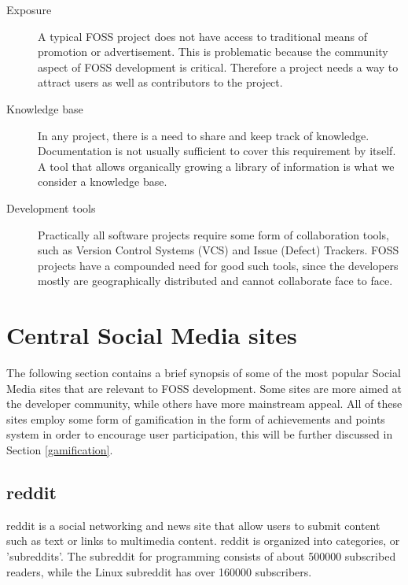 \documentclass[a4paper,11pt]{article} %
\begin{document}
\begin{description}
\item[Exposure] \hfill
  
  A typical FOSS project does not have access to traditional means of
  promotion or advertisement. This is problematic because the community
  aspect of FOSS development is critical. Therefore a project needs a way to
  attract users as well as contributors to the project.
\item[Knowledge base] \hfill

  In any project, there is a need to share and keep track of
  knowledge. Documentation is not usually sufficient to cover this
  requirement by itself. A tool that allows organically growing a
  library of information is what we consider a knowledge base.
\item[Development tools] \hfill
  
  Practically all software projects require some form of collaboration
  tools, such as Version Control Systems (VCS) and Issue (Defect)
  Trackers. FOSS projects have a compounded need for good such tools, since
  the developers mostly are geographically distributed and cannot
  collaborate face to face.
\end{description}

\section{Central Social Media sites}

The following section contains a brief synopsis of some of the most
popular Social Media sites that are relevant to FOSS development. Some
sites are more aimed at the developer community, while others have
more mainstream appeal.  All of these sites employ some form of
gamification in the form of achievements and points system in order to
encourage user participation, this will be further discussed in
Section \ref{gamification}.

\subsection{reddit}

reddit is a social networking and news site that allow users to submit
content such as text or links to multimedia content. reddit is
organized into categories, or 'subreddits'. The subreddit for
programming consists of about \num{500000} subscribed readers, while
the Linux subreddit has over \num{160000} subscribers.
\end{document}
